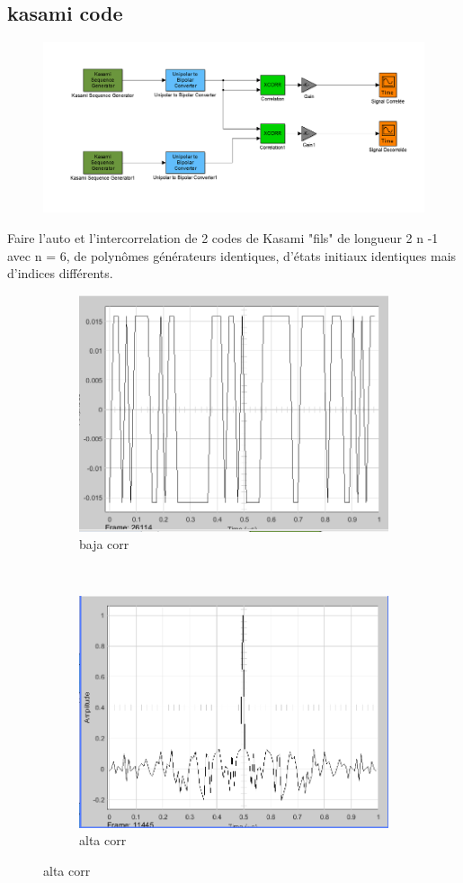 \documentclass{report}
\begin{document}
\newpage
\subsection{kasami code}
\begin{figure}[h]
	\centering
	\includegraphics[width=0.7\linewidth]{schema_q2_analise_code_kasami}
	\caption{}
	\label{fig:schemaq2analisecodekasami}
\end{figure}

Faire l'auto et l'intercorrelation de 2 codes de Kasami "fils" de longueur 2 n -1 avec n = 6, de
polynômes générateurs identiques, d'états initiaux identiques mais d'indices différents.
\begin{figure}
	\centering
	\begin{subfigure}[b]{0.4\textwidth}
	\includegraphics[width=0.7\linewidth]{kasami_bajacorr}
\caption{baja corr}
\label{fig:kasamibajacorr}
	\end{subfigure}
	~ %
	\begin{subfigure}[b]{0.4\textwidth}
	\includegraphics[width=0.7\linewidth]{kasami_altacorr}
\caption{alta corr}
\label{fig:kasamibajacorr}
	\end{subfigure}
\end{figure}
\end{document}
